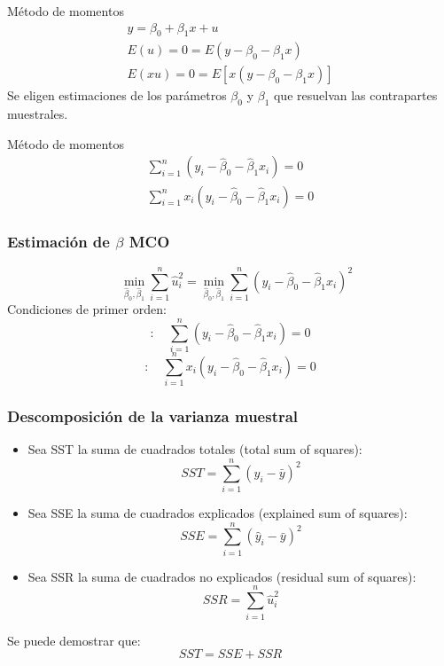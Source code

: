\documentclass{beamer}
\begin{document}
\begin{frame}{Método de momentos}
\begin{eqnarray}
y=\beta_0+\beta_1x+u\\
      E(u)= 0= E(y-\beta_0-\beta_1x) \\
E(xu)=0=E[x(y-\beta_0-\beta_1x)]
\end{eqnarray}
Se eligen estimaciones de los parámetros $\beta_0$ y $\beta_1$ que resuelvan las contrapartes muestrales.
\end{frame}
\begin{frame}{Método de momentos}
\begin{eqnarray}
     \sum_{i=1}^{n} (y_i - \hat{\beta}_0 - \hat{\beta}_1 x_i) = 0  \\
 \sum_{i=1}^{n} x_i(y_i - \hat{\beta}_0 - \hat{\beta}_1 x_i) = 0 
\end{eqnarray}
    
\end{frame}
\begin{frame}
	\frametitle{Estimaci\'on de $\beta$ MCO} %
\begin{equation*}
\quad \min_{\hat{\beta}_0, \hat{\beta}_1} \sum_{i=1}^{n} \hat{u}_i^2 = \min_{\hat{\beta}_0, \hat{\beta}_1} \sum_{i=1}^{n} (y_i - \hat{\beta}_0 - \hat{\beta}_1 x_i)^2
\end{equation*}
Condiciones de primer orden:
\begin{equation*}
[\hat{\beta}_0] : \quad \sum_{i=1}^{n} (y_i - \hat{\beta}_0 - \hat{\beta}_1 x_i) = 0 
\end{equation*}
\begin{equation*}
[\hat{\beta}_1] : \quad \sum_{i=1}^{n} x_i(y_i - \hat{\beta}_0 - \hat{\beta}_1 x_i) = 0
\end{equation*}
\end{frame}
\begin{frame}
	\frametitle{Descomposición de la varianza muestral} %
	\begin{itemize}
		\item Sea SST la suma de cuadrados totales (total sum of squares):
		\[ SST = \sum_{i=1}^{n} (y_i - \bar{y})^2 \]
		
		\item Sea SSE la suma de cuadrados explicados (explained sum of squares):
		\[ SSE = \sum_{i=1}^{n} (\hat{y}_i - \bar{y})^2 \]
		
		\item Sea SSR la suma de cuadrados no explicados (residual sum of squares):
		\[ SSR = \sum_{i=1}^{n} \hat{u}_i^2 \]
	\end{itemize}
	Se puede demostrar que:
	\[ SST = SSE + SSR \]
\end{frame}	
\end{document}
